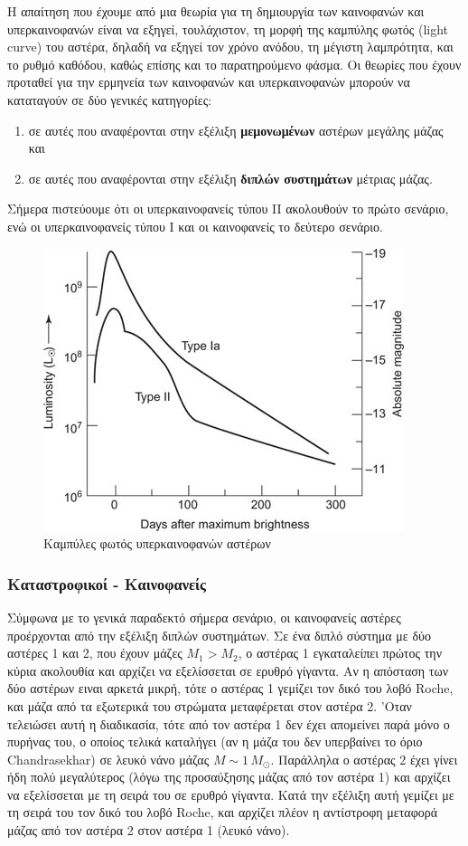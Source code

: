 Η απαίτηση που έχουμε από μια θεωρία για τη δημιουργία των καινοφανών και υπερκαινοφανών είναι να εξηγεί, τουλάχιστον, τη μορφή της καμπύλης φωτός (light curve) του αστέρα, δηλαδή να εξηγεί τον χρόνο ανόδου, τη μέγιστη λαμπρότητα, και το ρυθμό καθόδου, καθώς επίσης και το παρατηρούμενο φάσμα. Οι θεωρίες που έχουν προταθεί για την ερμηνεία των καινοφανών και υπερκαινοφανών μπορούν να καταταγούν σε δύο γενικές κατηγορίες:
\begin{enumerate}
    \item σε αυτές που αναφέρονται στην εξέλιξη \textbf{μεμονωμένων} αστέρων μεγάλης μάζας και
    \item σε αυτές που αναφέρονται στην εξέλιξη \textbf{διπλών συστημάτων} μέτριας μάζας.
\end{enumerate}
Σήμερα πιστεύουμε ότι οι υπερκαινοφανείς τύπου II ακολουθούν το πρώτο σενάριο, ενώ οι υπερκαινοφανείς τύπου I και οι καινοφανείς το δεύτερο σενάριο.

\begin{figure}
    \centering
    \includegraphics{Figures/sne_light_curves.jpeg}
    \caption{Καμπύλες φωτός υπερκαινοφανών αστέρων}
    \label{fig:sne_light_curves}
\end{figure}

\subsubsection{Καταστροφικοί - Καινοφανείς}
Σύμφωνα με το γενικά παραδεκτό σήμερα σενάριο, οι καινοφανείς αστέρες προέρχονται από την εξέλιξη διπλών συστημάτων. Σε ένα διπλό σύστημα με δύο αστέρες 1 και 2, που έχουν μάζες $M_1 > M_2$, ο αστέρας 1 εγκαταλείπει πρώτος την κύρια ακολουθία και αρχίζει να εξελίσσεται σε ερυθρό γίγαντα. Αν η απόσταση των δύο αστέρων ειναι αρκετά μικρή, τότε ο αστέρας 1 γεμίζει τον δικό του λοβό Roche, και μάζα από τα εξωτερικά του στρώματα μεταφέρεται στον αστέρα 2. 'Οταν τελειώσει αυτή η διαδικασία, τότε από τον αστέρα 1 δεν έχει απομείνει παρά μόνο ο πυρήνας του, ο οποίος τελικά καταλήγει (αν η μάζα του δεν υπερβαίνει το όριο Chandrasekhar) σε λευκό νάνο μάζας $M \sim 1\,M_\odot$. Παράλληλα ο αστέρας 2 έχει γίνει ήδη πολύ μεγαλύτερος (λόγω της προσαύξησης μάζας από τον αστέρα 1) και αρχίζει να εξελίσσεται με τη σειρά του σε ερυθρό γίγαντα. Κατά την εξέλιξη αυτή γεμίζει με τη σειρά του τον δικό του λοβό Roche, και αρχίζει πλέον η αντίστροφη μεταφορά μάζας από τον αστέρα 2 στον αστέρα 1 (λευκό νάνο).

